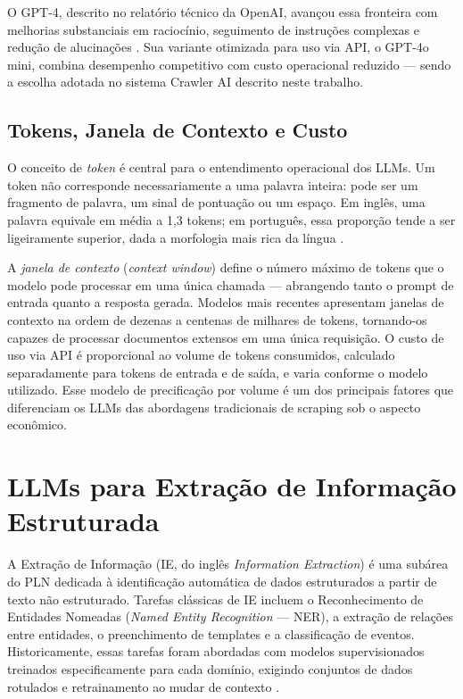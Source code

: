 \documentclass[tcc,capa]{texifsul}
\begin{document}
O GPT-4, descrito no relatório técnico da OpenAI, avançou essa fronteira com melhorias substanciais em raciocínio, seguimento de instruções complexas e redução de alucinações \cite{OpenAI2023}. Sua variante otimizada para uso via API, o GPT-4o mini, combina desempenho competitivo com custo operacional reduzido — sendo a escolha adotada no sistema Crawler AI descrito neste trabalho.

\subsection*{Tokens, Janela de Contexto e Custo}

O conceito de \textit{token} é central para o entendimento operacional dos LLMs. Um token não corresponde necessariamente a uma palavra inteira: pode ser um fragmento de palavra, um sinal de pontuação ou um espaço. Em inglês, uma palavra equivale em média a 1,3 tokens; em português, essa proporção tende a ser ligeiramente superior, dada a morfologia mais rica da língua \cite{Zhao2023}.

A \textit{janela de contexto} (\textit{context window}) define o número máximo de tokens que o modelo pode processar em uma única chamada — abrangendo tanto o prompt de entrada quanto a resposta gerada. Modelos mais recentes apresentam janelas de contexto na ordem de dezenas a centenas de milhares de tokens, tornando-os capazes de processar documentos extensos em uma única requisição. O custo de uso via API é proporcional ao volume de tokens consumidos, calculado separadamente para tokens de entrada e de saída, e varia conforme o modelo utilizado. Esse modelo de precificação por volume é um dos principais fatores que diferenciam os LLMs das abordagens tradicionais de scraping sob o aspecto econômico.

\section{LLMs para Extração de Informação Estruturada}

A Extração de Informação (IE, do inglês \textit{Information Extraction}) é uma subárea do PLN dedicada à identificação automática de dados estruturados a partir de texto não estruturado. Tarefas clássicas de IE incluem o Reconhecimento de Entidades Nomeadas (\textit{Named Entity Recognition} — NER), a extração de relações entre entidades, o preenchimento de templates e a classificação de eventos. Historicamente, essas tarefas foram abordadas com modelos supervisionados treinados especificamente para cada domínio, exigindo conjuntos de dados rotulados e retrainamento ao mudar de contexto \cite{Brown2020}.
\end{document}
